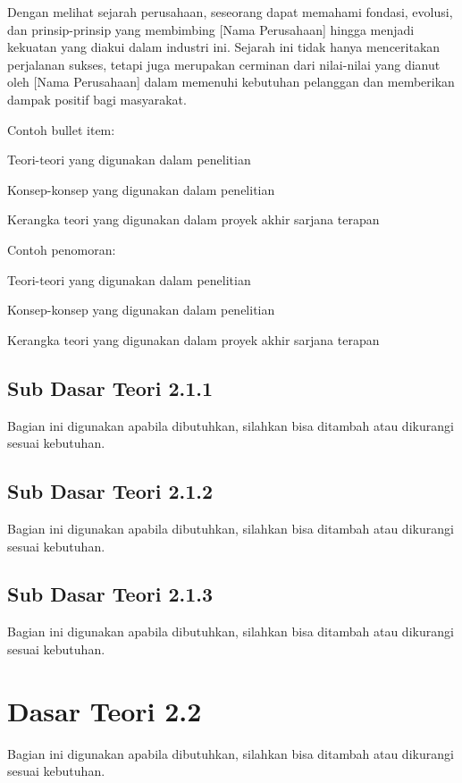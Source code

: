 Dengan melihat sejarah perusahaan, seseorang dapat memahami fondasi, evolusi, dan prinsip-prinsip yang membimbing [Nama Perusahaan] hingga menjadi kekuatan yang diakui dalam industri ini. Sejarah ini tidak hanya menceritakan perjalanan sukses, tetapi juga merupakan cerminan dari nilai-nilai yang dianut oleh [Nama Perusahaan] dalam memenuhi kebutuhan pelanggan dan memberikan dampak positif bagi masyarakat.

Contoh bullet item:
\begin{packed_item}
    \item Teori-teori yang digunakan dalam penelitian
    \item Konsep-konsep yang digunakan dalam penelitian
    \item Kerangka teori yang digunakan dalam proyek akhir sarjana terapan
\end{packed_item}

Contoh penomoran:
\begin{packed_enum}
	\item Teori-teori yang digunakan dalam penelitian
	\item Konsep-konsep yang digunakan dalam penelitian
	\item Kerangka teori yang digunakan dalam proyek akhir sarjana terapan
\end{packed_enum}

\subsection{Sub Dasar Teori 2.1.1}
Bagian ini digunakan apabila dibutuhkan, silahkan bisa ditambah atau dikurangi sesuai kebutuhan.

\subsection{Sub Dasar Teori 2.1.2}
Bagian ini digunakan apabila dibutuhkan, silahkan bisa ditambah atau dikurangi sesuai kebutuhan.

\subsection{Sub Dasar Teori 2.1.3}
Bagian ini digunakan apabila dibutuhkan, silahkan bisa ditambah atau dikurangi sesuai kebutuhan.

\section{Dasar Teori 2.2}
Bagian ini digunakan apabila dibutuhkan, silahkan bisa ditambah atau dikurangi sesuai kebutuhan.


